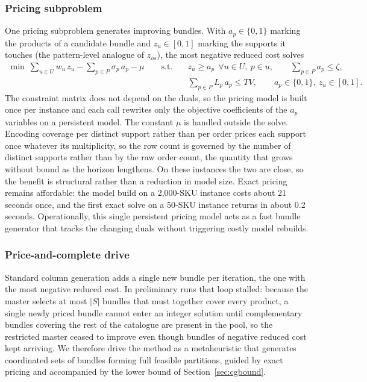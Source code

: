 \documentclass[]{interact}
\begin{document}
\subsubsection{Pricing subproblem}\label{sec:cgpricing}
One pricing subproblem generates improving bundles. With $a_p \in \{0,1\}$ marking the products of a candidate bundle and $z_u \in [0,1]$ marking the supports it touches (the pattern-level analogue of $z_{os}$), the most negative reduced cost solves
\[
\begin{aligned}
\min\ \sum_{u \in U} w_u\, z_u - \sum_{p \in P} \sigma_p\, a_p - \mu
\qquad \text{s.t.} \quad & z_u \ge a_p\ \ \forall u \in U,\ p \in u, \qquad \sum_{p \in P} a_p \le \zeta, \\
& \sum_{p \in P} L_p\, a_p \le T V, \qquad a_p \in \{0,1\},\ z_u \in [0,1].
\end{aligned}
\]
The constraint matrix does not depend on the duals, so the pricing model is built once per instance and each call rewrites only the objective coefficients of the $a_p$ variables on a persistent model. The constant $\mu$ is handled outside the solve. Encoding coverage per distinct support rather than per order prices each support once whatever its multiplicity, so the row count is governed by the number of distinct supports rather than by the raw order count, the quantity that grows without bound as the horizon lengthens. On these instances the two are close, so the benefit is structural rather than a reduction in model size. Exact pricing remains affordable: the model build on a 2,000-SKU instance costs about 21 seconds once, and the first exact solve on a 50-SKU instance returns in about 0.2 seconds. Operationally, this single persistent pricing model acts as a fast bundle generator that tracks the changing duals without triggering costly model rebuilds.

\subsubsection{Price-and-complete drive}\label{sec:cgdrive}
Standard column generation adds a single new bundle per iteration, the one with the most negative reduced cost. In preliminary runs that loop stalled: because the master selects at most $|S|$ bundles that must together cover every product, a single newly priced bundle cannot enter an integer solution until complementary bundles covering the rest of the catalogue are present in the pool, so the restricted master ceased to improve even though bundles of negative reduced cost kept arriving. We therefore drive the method as a metaheuristic that generates coordinated sets of bundles forming full feasible partitions, guided by exact pricing and accompanied by the lower bound of Section~\ref{sec:cgbound}.
\end{document}
